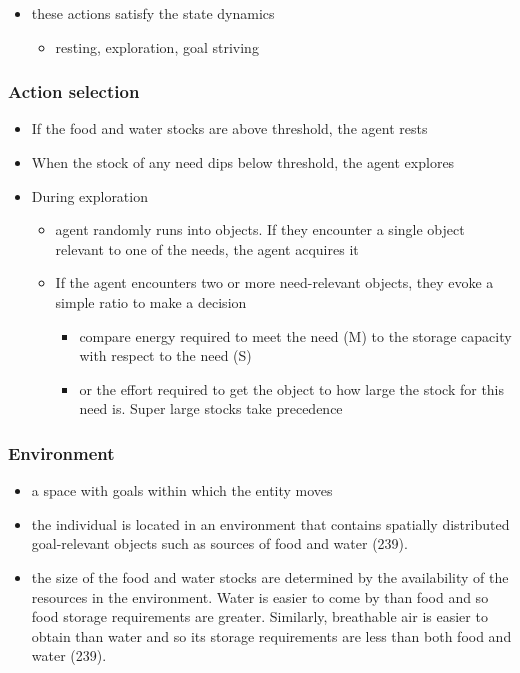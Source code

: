 \documentclass[english,,man]{apa6}
\providecommand{\tightlist}{%
  \setlength{\itemsep}{0pt}\setlength{\parskip}{0pt}}
\theoremstyle{definition}
\theoremstyle{definition}
\theoremstyle{definition}
\theoremstyle{remark}
\begin{document}
\begin{itemize}
\item
  these actions satisfy the state dynamics

  \begin{itemize}
  \tightlist
  \item
    resting, exploration, goal striving
  \end{itemize}
\end{itemize}

\hypertarget{action-selection-1}{%
\subsubsection{Action selection}\label{action-selection-1}}

\begin{itemize}
\item
  If the food and water stocks are above threshold, the agent rests
\item
  When the stock of any need dips below threshold, the agent explores
\item
  During exploration

  \begin{itemize}
  \tightlist
  \item
    agent randomly runs into objects. If they encounter a single object
    relevant to one of the needs, the agent acquires it
  \item
    If the agent encounters two or more need-relevant objects, they
    evoke a simple ratio to make a decision

    \begin{itemize}
    \tightlist
    \item
      compare energy required to meet the need (M) to the storage
      capacity with respect to the need (S)
    \item
      or the effort required to get the object to how large the stock
      for this need is. Super large stocks take precedence
    \end{itemize}
  \end{itemize}
\end{itemize}

\hypertarget{environment}{%
\subsubsection{Environment}\label{environment}}

\begin{itemize}
\tightlist
\item
  a space with goals within which the entity moves
\item
  the individual is located in an environment that contains spatially
  distributed goal-relevant objects such as sources of food and water
  (239).
\item
  the size of the food and water stocks are determined by the
  availability of the resources in the environment. Water is easier to
  come by than food and so food storage requirements are greater.
  Similarly, breathable air is easier to obtain than water and so its
  storage requirements are less than both food and water (239).
\end{itemize}
\end{document}
